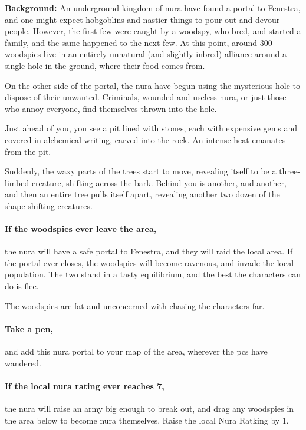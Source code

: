 \textbf{Background:}
An underground kingdom of nura have found a portal to Fenestra, and one might expect hobgoblins and nastier things to pour out and devour people.
However, the first few were caught by a woodspy, who bred, and started a family, and the same happened to the next few.
At this point, around 300 woodspies live in an entirely unnatural (and slightly inbred) alliance around a single hole in the ground, where their food comes from.

On the other side of the portal, the nura have begun using the mysterious hole to dispose of their unwanted.
Criminals, wounded and useless nura, or just those who annoy everyone, find themselves thrown into the hole.

\begin{boxtext}

  Just ahead of you, you see a pit lined with stones, each with expensive gems and covered in alchemical writing, carved into the rock.
  An intense heat emanates from the pit.

  Suddenly, the waxy parts of the trees start to move, revealing itself to be a three-limbed creature, shifting across the bark.
  Behind you is another, and another, and then an entire tree pulls itself apart, revealing another two dozen of the shape-shifting creatures.

\end{boxtext}

\paragraph{If the woodspies ever leave the area,}
the nura will have a safe portal to Fenestra, and they will raid the local area.
If the portal ever closes, the woodspies will become ravenous, and invade the local population.
The two stand in a tasty equilibrium, and the best the characters can do is flee.

The woodspies are fat and unconcerned with chasing the characters far.


\paragraph{Take a pen,}
and add this nura portal to your map of the area, wherever the \glspl{pc} have wandered.

\paragraph{If the local nura rating ever reaches 7,}
the nura will raise an army big enough to break out, and drag any woodspies in the area below to become nura themselves.
Raise the local Nura Ratking by 1.


\stopcontents[sq]


